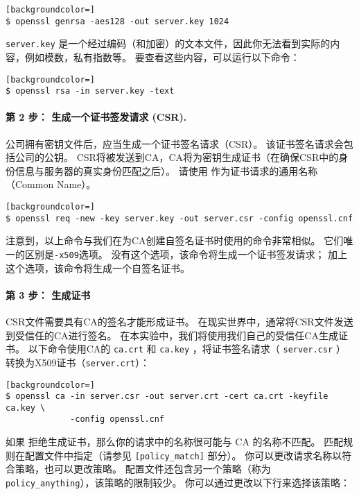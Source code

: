 \begin{lstlisting}[backgroundcolor=]
$ openssl genrsa -aes128 -out server.key 1024
\end{lstlisting}

\texttt{server.key} 是一个经过编码（和加密）的文本文件，因此你无法看到实际的内容，例如模数，私有指数等。
要查看这些内容，可以运行以下命令：

\begin{lstlisting}[backgroundcolor=]
$ openssl rsa -in server.key -text
\end{lstlisting}



\paragraph{第 2 步： 生成一个证书签发请求 (CSR).}
公司拥有密钥文件后，应当生成一个证书签名请求（CSR）。
该证书签名请求会包括公司的公钥。
CSR将被发送到CA，CA将为密钥生成证书（在确保CSR中的身份信息与服务器的真实身份匹配之后）。
请使用 \pkiserver 作为证书请求的通用名称（Common Name）。

\begin{lstlisting}[backgroundcolor=]
$ openssl req -new -key server.key -out server.csr -config openssl.cnf
\end{lstlisting}


注意到，以上命令与我们在为CA创建自签名证书时使用的命令非常相似。
它们唯一的区别是{\tt -x509}选项。
没有这个选项，该命令将生成一个证书签发请求；
加上这个选项，该命令将生成一个自签名证书。

\paragraph{第 3 步： 生成证书}
CSR文件需要具有CA的签名才能形成证书。
在现实世界中，通常将CSR文件发送到受信任的CA进行签名。
在本实验中，我们将使用我们自己的受信任CA生成证书。
以下命令使用CA的 {\tt ca.crt} 和 {\tt ca.key} ，将证书签名请求（ {\tt server.csr} ）转换为X509证书（{\tt server.crt}）：

\begin{lstlisting}[backgroundcolor=]
$ openssl ca -in server.csr -out server.crt -cert ca.crt -keyfile ca.key \
             -config openssl.cnf
\end{lstlisting}

如果 \OpenSSL 拒绝生成证书，那么你的请求中的名称很可能与 CA 的名称不匹配。
匹配规则在配置文件中指定（请参见 \texttt{[policy\_match]} 部分）。
你可以更改请求名称以符合策略，也可以更改策略。
配置文件还包含另一个策略（称为 \texttt {policy\_anything}），该策略的限制较少。
你可以通过更改以下行来选择该策略：

